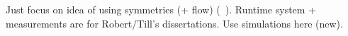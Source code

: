 Just focus on idea of using symmetries (+ flow) (~\cite{goens_scopes17}). Runtime system + measurements are for Robert/Till's dissertations.
Use simulations here (new).